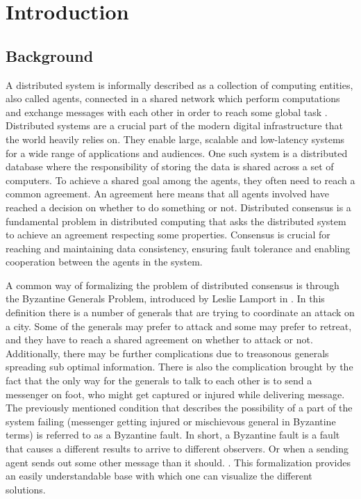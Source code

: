 \section{Introduction}
\thispagestyle{empty}

\subsection{Background}

A distributed system is informally described as a collection of computing entities, also called agents, connected in a shared network which perform computations and exchange messages with each other in order to reach some global task \cite{Coulouris_systems_2005}. Distributed systems are a crucial part of the modern digital infrastructure that the world heavily relies on. They enable large, scalable and low-latency systems for a wide range of applications and audiences. One such system is a distributed database where the responsibility of storing the data is shared across a set of computers. To achieve a shared goal among the agents, they often need to reach a common agreement. An agreement here means that all agents involved have reached a decision on whether to do something or not. Distributed consensus is a fundamental problem in distributed computing that asks the distributed system to achieve an agreement respecting some properties. Consensus is crucial for reaching and maintaining data consistency, ensuring fault tolerance and enabling cooperation between the agents in the system. \cite{Lynch_distributed_2017}

A common way of formalizing the problem of distributed consensus is through the Byzantine Generals Problem, introduced by Leslie Lamport in \cite{lamportByzantineGeneralsProblem}. In this definition there is a number of generals that are trying to coordinate an attack on a city. Some of the generals may prefer to attack and some may prefer to retreat, and they have to reach a shared agreement on whether to attack or not. Additionally, there may be further complications due to treasonous generals spreading sub optimal information. There is also the complication brought by the fact that the only way for the generals to talk to each other is to send a messenger on foot, who might get captured or injured while delivering message. 
The previously mentioned condition that describes the possibility of a part of the system failing (messenger getting injured or mischievous general in Byzantine terms) is referred to as a Byzantine fault. In short, a Byzantine fault is a fault that causes a different results to arrive to different observers. Or when a sending agent sends out some other message than it should. \cite{driscollRealByzantineGenerals2004}. 
This formalization provides an easily understandable base with which one can visualize the different solutions.

